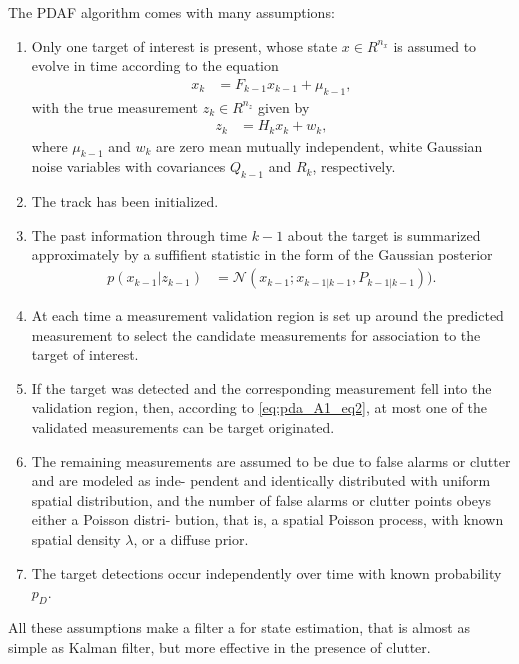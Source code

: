 The PDAF algorithm comes with many assumptions:
\begin{enumerate}
    \item Only one target of interest is present, whose state $x \in R^{n_x}$ is assumed to evolve in time according to the equation
        \begin{align}
            x_k &= F_{k-1} x_{k-1} + \mu_{k-1},
        \end{align}
        with the true measurement $z_k \in R^{n_z}$ given by
        \begin{align}
            \label{eq:pda_A1_eq2}
            z_k &= H_k x_k + w_k,
        \end{align}
        where $\mu_{k-1}$ and $w_k$ are zero mean mutually independent, white Gaussian noise variables with covariances $Q_{k-1}$ and $R_k$, respectively.
    \item The track has been initialized.
    \item The past information through time $k-1$ about the target is summarized approximately by a suffifient statistic in the form of the Gaussian posterior
        \begin{align}
            p(x_{k-1}|z_{k-1}) &= \mathcal{N}(x_{k-1}; x_{k-1|k-1}, P_{k-1|k-1})). \label{eq:pda_A3}
        \end{align}
    \item At each time a measurement validation region is set up around the predicted measurement to select the candidate measurements for association to the target of interest.
    \item If the target was detected and the corresponding
    measurement fell into the validation region, then,
    according to \eqref{eq:pda_A1_eq2}, at most one of the validated measurements can be target originated.
    \item The remaining measurements are assumed to be due
    to false alarms or clutter and are modeled as inde-
    pendent and identically distributed with uniform spatial distribution, and the number of false alarms or clutter points obeys either a Poisson distri-
    bution, that is, a spatial Poisson process, with known
    spatial density $\lambda$, or a diffuse prior.
    \item The target detections occur independently over time
    with known probability $p_D$.
\end{enumerate}
All these assumptions make a filter a for state estimation, that is almost as simple as Kalman filter, but more effective in the presence of clutter.

